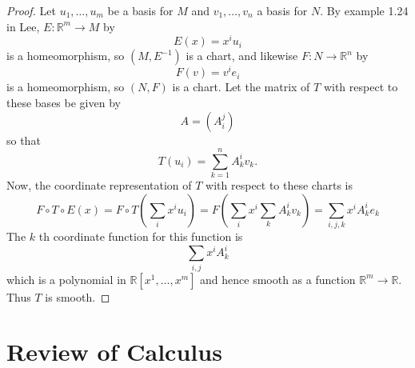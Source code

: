 \documentclass[reqno]{amsart}
\theoremstyle{plain}%
\theoremstyle{definition}
\theoremstyle{remark}
\begin{document}
    \begin{proof}
        Let
        $u_1, \ldots, u_m$ be a basis for $M$ and 
         $v_1, \ldots, v_n$ a basis for $N$. By example 1.24 in Lee,
         $E  \colon \mathbb{R}^{m} \to M$ by
         \[
         E(x) = x^{i}u_i
         \] 
         is a homeomorphism, so $\left( M, E^{-1} \right) $ is a chart, and
         likewise
         $F  \colon N \to \mathbb{R}^{n}$ by
         \[
         F(v) = v^{i} e_i
         \] 
         is a homeomorphism, so $\left( N, F \right) $ is a chart.
         Let the matrix of $T$ with respect to these bases be given by
         \[
         A = \left( A_{i}^{j} \right) 
         \] 
         so that
         \[
         T(u_i) = \sum_{k=1}^{n} A_{k}^{i} v_k.
         \] 
         Now, the
         coordinate representation of $T$ with respect to these charts is
         \[
         F \circ T \circ E (x) =
         F \circ T \left( \sum_{i} x^{i} u_i \right) 
         = F \left( \sum_i x^{i} \sum_{k} A_{k}^{i} v_k \right) 
         = \sum_{i,j,k} x^{i} A_{k}^{i} e_k
         \] 
         The $k$ th coordinate function for this function is
         \[
         \sum_{i,j} x^{i} A_k^{i} 
         \] 
         which is a polynomial 
         in $\mathbb{R} \left[ x^{1},\ldots, x^{m} \right] $ and hence
         smooth as a function
         $\mathbb{R}^{m} \to \mathbb{R}$. Thus
         $T$ is smooth.
    \end{proof}


    



\newpage
\appendix
\section{Review of Calculus}
\end{document}
